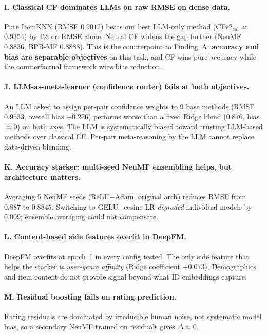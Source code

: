 \documentclass[11pt,a4paper]{article}
\begin{document}
\paragraph{I. Classical CF dominates LLMs on raw RMSE on dense data.}
Pure ItemKNN (RMSE $0.9012$) beats our best LLM-only method
(CFv2$_{\text{cal}}$ at $0.9354$) by 4\% on RMSE alone. Neural CF widens
the gap further (NeuMF $0.8836$, BPR-MF $0.8888$). This is the
counterpoint to Finding~A: \textbf{accuracy and bias are separable
objectives} on this task, and CF wins pure accuracy while the
counterfactual framework wins bias reduction.

\paragraph{J. LLM-as-meta-learner (confidence router) fails at both
objectives.}
An LLM asked to assign per-pair confidence weights to 9 base methods
(RMSE $0.9533$, overall bias $+0.226$) performs worse than a fixed
Ridge blend ($0.876$, bias $\approx 0$) on both axes. The LLM is
systematically biased toward trusting LLM-based methods over classical
CF. Per-pair meta-reasoning by the LLM cannot replace data-driven
blending.

\paragraph{K. Accuracy stacker: multi-seed NeuMF ensembling helps, but
architecture matters.}
Averaging 5 NeuMF seeds (ReLU$+$Adam, original arch) reduces RMSE from
$0.887$ to $0.8845$. Switching to GELU$+$cosine-LR
\emph{degraded} individual models by $0.009$; ensemble averaging could
not compensate.

\paragraph{L. Content-based side features overfit in DeepFM.}
DeepFM overfits at epoch~1 in every config tested. The only side feature
that helps the stacker is \emph{user-genre affinity} (Ridge coefficient
$+0.073$). Demographics and item content do not provide signal beyond
what ID embeddings capture.

\paragraph{M. Residual boosting fails on rating prediction.}
Rating residuals are dominated by irreducible human noise, not
systematic model bias, so a secondary NeuMF trained on residuals gives
$\Delta \approx 0$.
\end{document}
